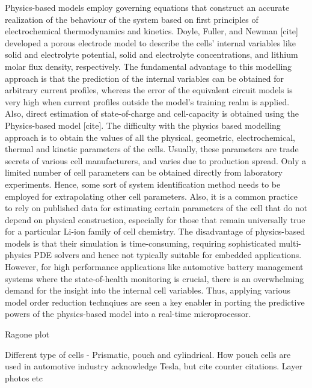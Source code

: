 Physics-based  models  employ governing  equations  that  construct an  accurate
realization  of  the   behaviour  of  the  system  based   on  first  principles
of   electrochemical   thermodynamics   and   kinetics.   Doyle,   Fuller,   and
Newman  {[}cite{]}   developed  a  porous   electrode  model  to   describe  the
cells\textquoteright{} internal variables like  solid and electrolyte potential,
solid  and   electrolyte  concentrations,   and  lithium  molar   flux  density,
respectively. The fundamental  advantage to this modelling approach  is that the
prediction  of the  internal variables  can  be obtained  for arbitrary  current
profiles, whereas the  error of the equivalent circuit models  is very high when
current profiles outside  the model\textquoteright s training  realm is applied.
Also, direct estimation  of state-of-charge and cell-capacity  is obtained using
the  Physics-based  model {[}cite{]}.  The  difficulty  with the  physics  based
modelling  approach is  to obtain  the values  of all  the physical,  geometric,
electrochemical, thermal  and kinetic  parameters of  the cells.  Usually, these
parameters are  trade secrets of various  cell manufacturers, and varies  due to
production spread.  Only a  limited number  of cell  parameters can  be obtained
directly from laboratory experiments. Hence,  some sort of system identification
method needs to be employed for extrapolating other cell parameters. Also, it is
a common practice to rely on published data for estimating certain parameters of
the cell that do not depend  on physical construction, especially for those that
remain universally  true for a particular  Li-ion family of cell  chemistry. The
disadvantage of physics-based models is that their simulation is time-consuming,
requiring  sophisticated  multi-physics  PDE  solvers and  hence  not  typically
suitable for  embedded applications. However, for  high performance applications
like automotive battery management  systems where the state-of-health monitoring
is crucial,  there is an overwhelming  demand for the insight  into the internal
cell variables. Thus, applying various model order reduction technqiues are seen
a key enabler in porting the predictive powers of the physics-based model into a
real-time microprocessor.




Ragone plot

Different type of cells - Prismatic,  pouch and cylindrical. How pouch cells are
used in automotive industry acknowledge Tesla, but cite counter citations. Layer
photos etc

